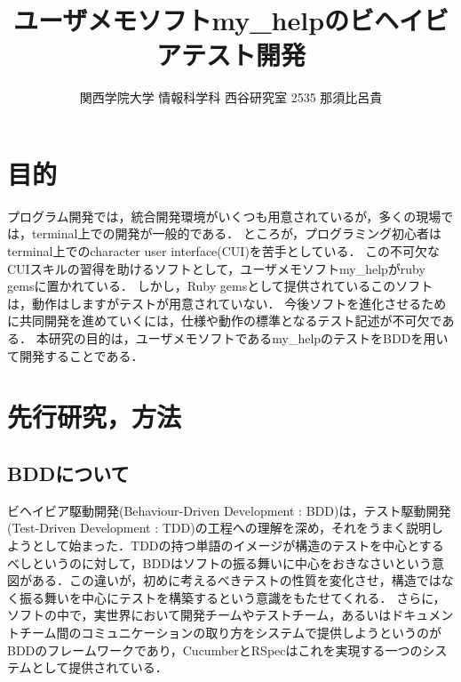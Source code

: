 \documentclass[10pt,a4j,twocolumn]{jsarticle}
\begin{document}
\title{ユーザメモソフトmy\_helpのビヘイビアテスト開発}
\author{関西学院大学 情報科学科 西谷研究室 2535 那須比呂貴}
\date{}
\maketitle
\section{目的}
プログラム開発では，統合開発環境がいくつも用意されているが，多くの現場では，terminal上での開発が一般的である．
ところが，プログラミング初心者はterminal上でのcharacter user interface(CUI)を苦手としている．
この不可欠なCUIスキルの習得を助けるソフトとして，ユーザメモソフトmy\_helpがruby gemsに置かれている．
しかし，Ruby gemsとして提供されているこのソフトは，動作はしますがテストが用意されていない．
今後ソフトを進化させるために共同開発を進めていくには，仕様や動作の標準となるテスト記述が不可欠である．
本研究の目的は，ユーザメモソフトであるmy\_helpのテストをBDDを用いて開発することである．

\section{先行研究，方法}
\subsection{BDDについて}
ビヘイビア駆動開発(Behaviour-Driven Development : BDD)は，テスト駆動開発(Test-Driven Development : TDD)の工程への理解を深め，それをうまく説明しようとして始まった．TDDの持つ単語のイメージが構造のテストを中心とするべしというのに対して，BDDはソフトの振る舞いに中心をおきなさいという意図がある．この違いが，初めに考えるべきテストの性質を変化させ，構造ではなく振る舞いを中心にテストを構築するという意識をもたせてくれる．
さらに，ソフトの中で，実世界において開発チームやテストチーム，あるいはドキュメントチーム間のコミュニケーションの取り方をシステムで提供しようというのがBDDのフレームワークであり，CucumberとRSpecはこれを実現する一つのシステムとして提供されている．
\end{document}
